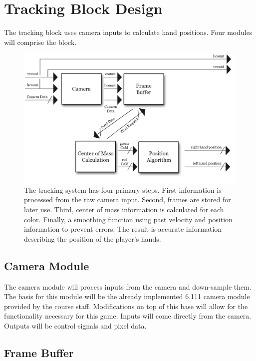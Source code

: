 \section{Tracking Block Design}
\label{sec:tracking}

The tracking block uses camera inputs to calculate hand positions. Four modules
will comprise the block.

\begin{figure}
\centering
\includegraphics[scale=1]{img/tracking.png}
\caption{The tracking system has four primary steps. First information is
processed from the raw camera input. Second, frames are stored for later use.
Third, center of mass information is calculated for each color. Finally, a
smoothing function using past velocity and position information to prevent
errors. The result is accurate information describing the position of the
player's hands.}
\label{fig:tracking}
\end{figure}

\subsection{Camera Module}

The camera module will process inputs from the camera and down-sample them. The
basis for this module will be the already implemented 6.111 camera module
provided by the course staff. Modifications on top of this base will allow for
the functionality necessary for this game. Inputs will come directly from the
camera. Outputs will be control signals and pixel data.

\subsection{Frame Buffer}

